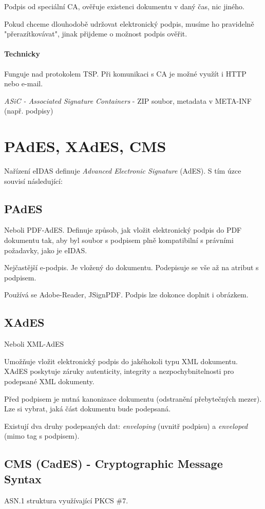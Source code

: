 \documentclass[10pt,a4paper]{article}
\begin{document}
Podpis od speciální CA, ověřuje existenci dokumentu v daný čas, nic jiného.

Pokud chceme dlouhodobě udržovat elektronický podpis, musíme ho pravidelně "přerazítkovávat", jinak přijdeme o možnost podpis ověřit.

\paragraph{Technicky}
Funguje nad protokolem TSP.
Při komunikaci s CA je možné využít i HTTP nebo e-mail.

\textit{ASiC - Associated Signature Containers} - ZIP soubor, metadata v META-INF (např. podpisy)

\section{PAdES, XAdES, CMS}

Nařízení eIDAS definuje \textit{Advanced Electronic Signature} (AdES).
S tím úzce souvisí následující:

\subsection{PAdES}
Neboli PDF-AdES.
Definuje způsob, jak vložit elektronický podpis do PDF dokumentu tak, aby byl soubor s podpisem plně kompatibilní s právními požadavky, jako je eIDAS.

Nejčastější e-podpis. Je vložený do dokumentu. Podepisuje se vše až na atribut s podpisem.

Používá se Adobe-Reader, JSignPDF. Podpis lze dokonce doplnit i obrázkem.


\subsection{XAdES}
Neboli XML-AdES

Umožňuje vložit elektronický podpis do jakéhokoli typu XML dokumentu. 
XAdES poskytuje záruky autenticity, integrity a nezpochybnitelnosti pro podepsané XML dokumenty.

Před podpisem je nutná kanonizace dokumentu (odstranění přebytečných mezer).
Lze si vybrat, jaká část dokumentu bude podepsaná.

Existují dva druhy podepsaných dat: \textit{enveloping} (uvnitř podpisu) a \textit{enveloped} (mimo tag s podpisem).

\subsection{CMS (CadES) - Cryptographic Message Syntax}
ASN.1 struktura využívající PKCS \#7.
\end{document}
